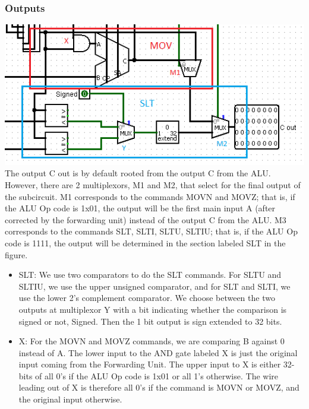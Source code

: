 \documentclass{article}
\begin{document}
\subsubsection{Outputs}
\includegraphics{OUTPUT.png}
The output C out is by default rooted from the output C from the ALU. However, there are 2 multiplexors, M1 and M2, that select for the final output of the subcircuit. M1 corresponds to the commands MOVN and MOVZ; that is, if the ALU Op code is 1x01, the output will be the first main input A (after corrected by the forwarding unit) instead of the output C from the ALU. M3 corresponds to the commands SLT, SLTI, SLTU, SLTIU; that is, if the ALU Op code is 1111, the output will be determined in the section labeled SLT in the figure. 
\begin{itemize}
\item
SLT: We use two comparators to do the SLT commands. For SLTU and SLTIU, we use the upper unsigned comparator, and for SLT and SLTI, we use the lower 2's complement comparator. We choose between the two outputs at multiplexor Y with a bit indicating whether the comparison is signed or not, Signed. Then the 1 bit output is sign extended to 32 bits. 

\item
X: For the MOVN and MOVZ commands, we are comparing B against 0 instead of A. The lower input to the AND gate labeled X is just the original input coming from the Forwarding Unit. The upper input to X is either 32-bits of all 0's if the ALU Op code is 1x01 or all 1's otherwise. The wire leading out of X is therefore all 0's if the command is MOVN or MOVZ, and the original input otherwise.

\end{itemize}
\end{document}
